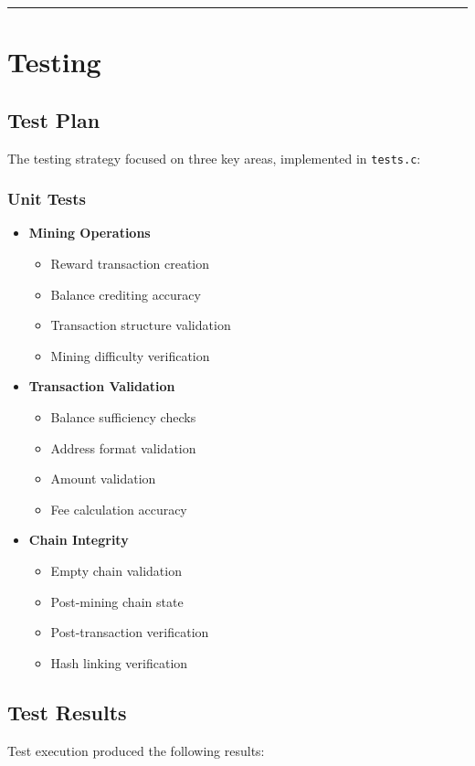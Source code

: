 \documentclass[12pt]{article}
\begin{document}
\vspace{1em}
\hrule
\vspace{1em}

\newpage
\section{Testing}

\subsection{Test Plan}
The testing strategy focused on three key areas, implemented in \texttt{tests.c}:

\subsubsection{Unit Tests}
\begin{itemize}
\item \textbf{Mining Operations}
    \begin{itemize}
    \item Reward transaction creation
    \item Balance crediting accuracy
    \item Transaction structure validation
    \item Mining difficulty verification
    \end{itemize}
\item \textbf{Transaction Validation}
    \begin{itemize}
    \item Balance sufficiency checks
    \item Address format validation
    \item Amount validation
    \item Fee calculation accuracy
    \end{itemize}
\item \textbf{Chain Integrity}
    \begin{itemize}
    \item Empty chain validation
    \item Post-mining chain state
    \item Post-transaction verification
    \item Hash linking verification
    \end{itemize}
\end{itemize}

\subsection{Test Results}
Test execution produced the following results:
\end{document}
